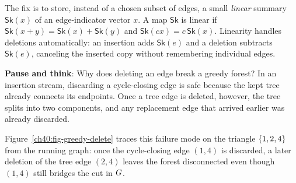 The fix is to store, instead of a chosen subset of edges, a small
\emph{linear} summary $\mathsf{Sk}(x)$ of an edge-indicator vector $x$. A map
$\mathsf{Sk}$ is linear if $\mathsf{Sk}(x+y)=\mathsf{Sk}(x)+\mathsf{Sk}(y)$ and
$\mathsf{Sk}(cx)=c\,\mathsf{Sk}(x)$. Linearity handles deletions automatically:
an insertion adds $\mathsf{Sk}(e)$ and a deletion subtracts $\mathsf{Sk}(e)$,
canceling the inserted copy without remembering individual edges.

\begin{recoverybox}
\textbf{Pause and think}: Why does deleting an edge break a greedy forest? In an insertion stream, discarding a cycle-closing edge is safe because the kept tree already connects its endpoints. Once a tree edge is deleted, however, the tree splits into two components, and any replacement edge that arrived earlier was already discarded.
\end{recoverybox}

Figure~\ref{ch40:fig-greedy-delete} traces this failure mode on the triangle $\{1,2,4\}$ from the running graph: once the cycle-closing edge $(1,4)$ is discarded, a later deletion of the tree edge $(2,4)$ leaves the forest disconnected even though $(1,4)$ still bridges the cut in $G$.


